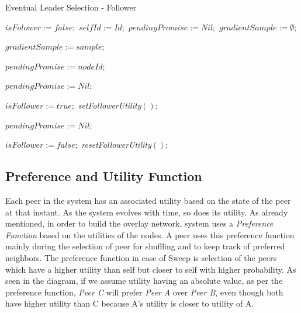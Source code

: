 \documentclass[12pt,a4paper,twoside,openright]{book}
\begin{document}
\begin{algorithm}[h]
\caption{Eventual Leader Selection - Follower} 
\label{follower}
\begin{algorithmic}[1]

  \State $isFolower := false;$
  \State $selfId := Id;$ $pendingPromise := Nil;$
  \State $gradientSample := \emptyset;$
\EndUponS

  \State $gradientSample := sample;$
 \EndUpon

    \State $pendingPromise := nodeId;$
    \EndTrigger
    \TriggerS[promiseTimeout]{}\EndTriggerS
  \Else
     \EndTrigger
  \EndIf
\EndUpon

\UponS[promiseTimeout]{}
  \State $pendingPromise := Nil;$
\EndUponS

    \TriggerS[followerLeaseTimeout]{}\EndTriggerS
    \TriggerS[cancelPromiseTimeout]{}\EndTriggerS
    \State $isFollower := true;$
    \State \emph{setFollowerUtility}$();$
  \EndIf
\EndUpon

\UponS[promiseTimeout]{}
  \State $pendingPromise := Nil;$
\EndUponS

\UponS[leaseTimeout]{} 
  \State $isFollower := false;$
  \State \emph{resetFollowerUtility}$();$
\EndUponS

\end{algorithmic}
\end{algorithm}







\subsection{Preference and Utility Function}

Each peer in the system has an associated utility based on the state of the peer at that instant. As the system evolves with time, so does its utility. As already mentioned, in order to build the overlay network, system uses a \textit {Preference Function} based on the utilities of the nodes. A peer uses this preference function mainly during the selection of peer for shuffling and to keep track of preferred neighbors. The preference function in case of  Sweep is selection of the peers which have a higher utility than self but closer to self with higher probability. As seen in the diagram, if we assume utility having an absolute value, as per the preference function, \textit{Peer C} will prefer \textit{Peer A} over \textit{Peer B}, even though both have higher utility than C because A's utility is closer to utility of A.
\end{document}
